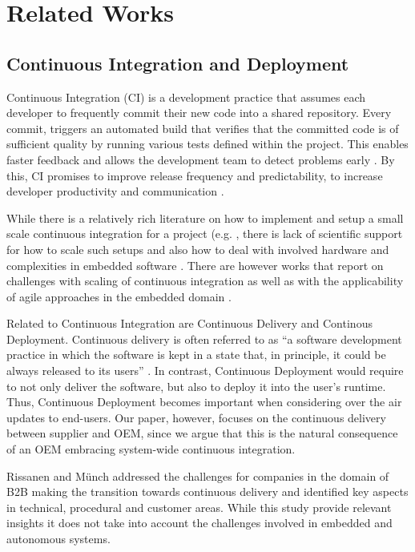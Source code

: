 \section{Related Works}\label{sec:relatedWorks}

\subsection{Continuous Integration and Deployment}

Continuous Integration (CI) is a development practice that assumes each developer to frequently commit their new code into a shared repository.
Every commit, triggers an automated build that verifies that the committed code is of sufficient quality by running various tests defined within the project. This enables faster feedback and allows the development team to detect problems early \cite{Fowler2006}.
By this, CI promises to improve release frequency and predictability, to increase developer productivity and communication \cite{Stahl2014}. 

While there is a relatively rich literature on how to implement and setup a small scale continuous integration for a project (e.g. \cite{Fowler2006,Neely2013}, there is lack of scientific support for how to scale such setups and also how to deal with involved hardware and complexities in embedded software \cite{Debbiche2014}. There are however works that report on challenges with scaling of continuous integration \cite{Roberts2004,Rogers2004} as well as with the applicability of agile approaches in the embedded domain \cite{Eklund2012}.

Related to Continuous Integration are Continuous Delivery and Continous Deployment.
Continuous delivery is often referred to as ``a software development practice in which the software is kept in a state that, in principle, it could be always released to its users'' \cite{Humble2010}. 
In contrast, Continuous Deployment would require to not only deliver the software, but also to deploy it into the user's runtime.
Thus, Continuous Deployment becomes important when considering over the air updates to end-users.
Our paper, however, focuses on the continuous delivery between supplier and OEM, since we argue that this is the natural consequence of an OEM embracing system-wide continuous integration.

Rissanen and M\"unch \cite{Rissanen2015} addressed the challenges for companies in the domain of B2B making the transition towards continuous delivery and identified key aspects in technical, procedural and customer areas. While this study provide relevant insights it does not take into account the challenges involved in embedded and autonomous systems. 



